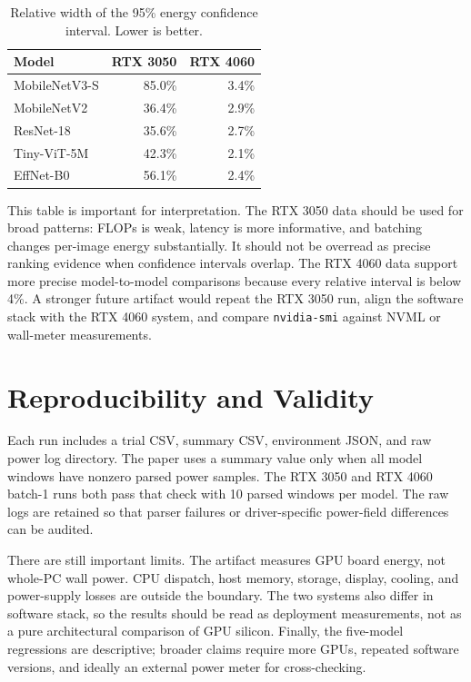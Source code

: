 \documentclass[conference]{IEEEtran}
\begin{document}
\begin{table}[t]
\centering
\caption{Relative width of the 95\% energy confidence interval. Lower is
better.}
\label{tab:relci}
\scriptsize
\begin{tabular}{@{}lrr@{}}
\toprule
Model & RTX 3050 & RTX 4060\\
\midrule
MobileNetV3-S & 85.0\% & 3.4\%\\
MobileNetV2 & 36.4\% & 2.9\%\\
ResNet-18 & 35.6\% & 2.7\%\\
Tiny-ViT-5M & 42.3\% & 2.1\%\\
EffNet-B0 & 56.1\% & 2.4\%\\
\bottomrule
\end{tabular}
\end{table}

This table is important for interpretation. The RTX 3050 data should be used
for broad patterns: FLOPs is weak, latency is more informative, and batching
changes per-image energy substantially. It should not be overread as precise
ranking evidence when confidence intervals overlap. The RTX 4060 data support
more precise model-to-model comparisons because every relative interval is
below 4\%. A stronger future artifact would repeat the RTX 3050 run, align the
software stack with the RTX 4060 system, and compare \texttt{nvidia-smi}
against NVML or wall-meter measurements.

\section{Reproducibility and Validity}

Each run includes a trial CSV, summary CSV, environment JSON, and raw power log
directory. The paper uses a summary value only when all model windows have
nonzero parsed power samples. The RTX 3050 and RTX 4060 batch-1 runs both pass
that check with 10 parsed windows per model. The raw logs are retained so that
parser failures or driver-specific power-field differences can be audited.

There are still important limits. The artifact measures GPU board energy, not
whole-PC wall power. CPU dispatch, host memory, storage, display, cooling, and
power-supply losses are outside the boundary. The two systems also differ in
software stack, so the results should be read as deployment measurements, not
as a pure architectural comparison of GPU silicon. Finally, the five-model
regressions are descriptive; broader claims require more GPUs, repeated
software versions, and ideally an external power meter for cross-checking.
\end{document}
